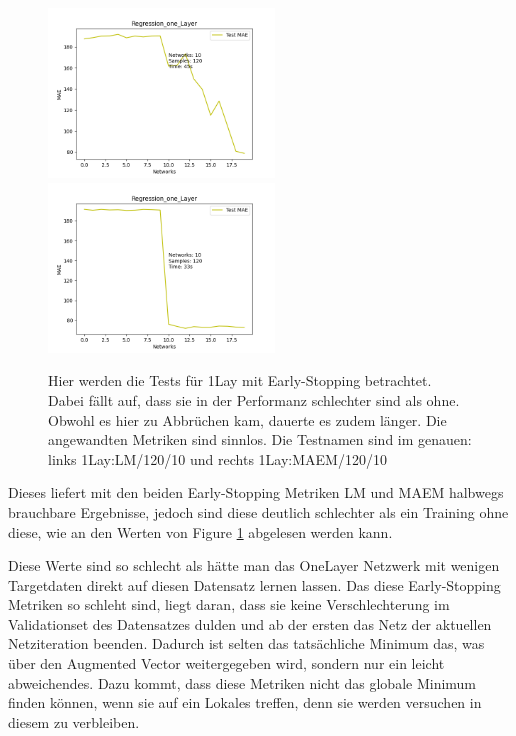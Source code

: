 \begin{figure}[htpb]
    \includegraphics[height=4.5cm]{../../Plots/ba_plots/earlystopping/lossmetric/onelayer_ts.png}
    \includegraphics[height=4.5cm]{../../Plots/ba_plots/earlystopping/intermetric/onelayer_ts.png}
    \caption{\label{fig:onelayermetrics} 
    \small{Hier werden die Tests für 1Lay mit Early-Stopping betrachtet. Dabei fällt auf, dass sie in der Performanz schlechter sind als ohne. 
    Obwohl es hier zu Abbrüchen kam, dauerte es zudem länger. Die angewandten Metriken sind sinnlos. Die Testnamen sind im genauen: 
    links 1Lay:LM/120/10 und rechts 1Lay:MAEM/120/10}}
\end{figure}

Dieses liefert mit den beiden Early-Stopping Metriken LM und MAEM 
halbwegs brauchbare Ergebnisse, jedoch sind diese deutlich schlechter als ein Training ohne diese, wie an den Werten von Figure \ref{fig:onelayermetrics} abgelesen 
werden kann. 

Diese Werte sind so schlecht als hätte man das OneLayer Netzwerk mit wenigen Targetdaten direkt auf diesen Datensatz lernen lassen. 
Das diese Early-Stopping Metriken so schleht sind, liegt daran, dass sie keine Verschlechterung im Validationset des Datensatzes dulden und ab 
der ersten das Netz der aktuellen Netziteration beenden. Dadurch ist selten das tatsächliche Minimum das, was über den Augmented Vector 
weitergegeben wird, sondern nur ein leicht abweichendes. Dazu kommt, dass diese Metriken nicht das globale Minimum finden können, wenn sie 
auf ein Lokales treffen, denn sie werden versuchen in diesem zu verbleiben. 
